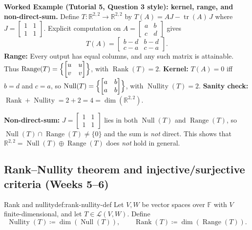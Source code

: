 \begin{examplebox}
\textbf{Worked Example (Tutorial 5, Question 3 style): kernel, range, and non-direct-sum.}
Define $T:\mathbb{R}^{2,2}\to\mathbb{R}^{2,2}$ by $T(A)=AJ-\operatorname{tr}(A)\,J$ where $J=\begin{bmatrix}1&1\\1&1\end{bmatrix}$.
Explicit computation on $A=\begin{bmatrix}a&b\\c&d\end{bmatrix}$ gives
\[
T(A)=\begin{bmatrix}b-d&b-d\\c-a&c-a\end{bmatrix}.
\]
\textbf{Range:} Every output has equal columns, and any such matrix is attainable. Thus
$\operatorname{Range}(T)=\Bigl\{\begin{bmatrix}u&u\\v&v\end{bmatrix}\Bigr\}$, with $\operatorname{Rank}(T)=2$.
\textbf{Kernel:} $T(A)=0$ iff $b=d$ and $c=a$, so
$\operatorname{Null}(T)=\Bigl\{\begin{bmatrix}a&b\\a&b\end{bmatrix}\Bigr\}$, with $\operatorname{Nullity}(T)=2$.
\textbf{Sanity check:} $\operatorname{Rank}+\operatorname{Nullity}=2+2=4=\dim(\mathbb{R}^{2,2})$. \checkmark

\textbf{Non-direct-sum:} $J=\begin{bmatrix}1&1\\1&1\end{bmatrix}$ lies in both $\operatorname{Null}(T)$ and $\operatorname{Range}(T)$, so $\operatorname{Null}(T)\cap\operatorname{Range}(T)\neq\{0\}$ and the sum is \emph{not} direct.
This shows that $\mathbb{R}^{2,2}=\operatorname{Null}(T)\oplus\operatorname{Range}(T)$ does \emph{not} hold in general.
\end{examplebox}


\subsection{Rank--Nullity theorem and injective/surjective criteria (Weeks 5--6)}

\begin{definition}{Rank and nullity}{def:rank-nullity-def}
Let $V,W$ be vector spaces over $\mathbb{F}$ with $V$ finite-dimensional, and let $T\in\mathcal{L}(V,W)$.
Define
\[
\operatorname{Nullity}(T)\coloneqq \dim(\operatorname{Null}(T)),
\qquad
\operatorname{Rank}(T)\coloneqq \dim(\operatorname{Range}(T)).
\]
\end{definition}

